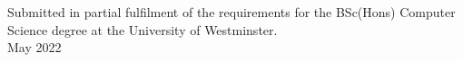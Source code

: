 \begin{titlepage}
\begin{center}


\large{Submitted in partial fulfilment of the requirements for the
BSc(Hons) Computer Science degree at the University of Westminster.} \\[0.5cm]
\large{May 2022}


\end{center}

\end{titlepage}